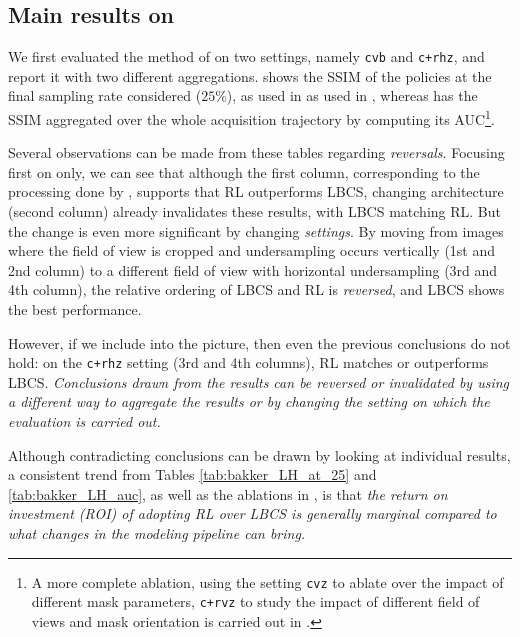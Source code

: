 \subsection{Main results on \texorpdfstring{\citet{bakker2020experimental}}{Bakker et al. (2020)}}
\label{s:ablations_results}
We first evaluated the method of \citet{bakker2020experimental} on two settings, namely \texttt{cvb} and \texttt{c+rhz}, and report it with two different aggregations.  shows the SSIM of the policies at the final sampling rate considered ($25\%$), as used in as used in \citet{bakker2020experimental}, whereas  has the SSIM aggregated over the whole acquisition trajectory by computing its AUC\footnote{A more complete ablation, using the setting \texttt{cvz} to ablate over the impact of different mask parameters, \texttt{c+rvz} to study the impact of different field of views and mask orientation is carried out in .}.

Several observations can be made from these tables regarding \textit{reversals}. Focusing first on  only, we can see that although the first column, corresponding to the processing done by \citet{bakker2020experimental}, supports that RL outperforms LBCS, changing architecture (second column) already invalidates these results, with LBCS matching RL. But the change is even more significant by changing \textit{settings}. By moving from images where the field of view is cropped and undersampling occurs vertically (1st and 2nd column) to a different field of view with horizontal undersampling (3rd and 4th column), the relative ordering of LBCS and RL is \textit{reversed}, and LBCS shows the best performance.

However, if we include  into the picture, then even the previous conclusions do not hold: on the \texttt{c+rhz} setting (3rd and 4th columns), RL matches or outperforms LBCS. \textit{Conclusions drawn from the results can be reversed or invalidated by using a different way to aggregate the results or by changing the setting on which the evaluation is carried out.}

Although contradicting conclusions can be drawn by looking at individual results, a consistent trend from Tables \ref{tab:bakker_LH_at_25} and \ref{tab:bakker_LH_auc}, as well as the ablations in , is that \textit{the return on investment (ROI) of adopting RL over LBCS is generally marginal compared to what changes in the modeling pipeline can bring.}

